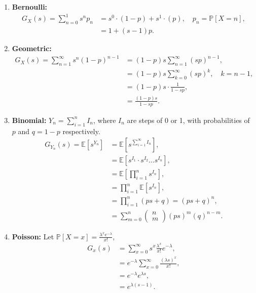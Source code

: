 \documentclass{article}
\begin{document}
\begin{enumerate}
    \item \textbf{Bernoulli:}
    \begin{align}
        G_X(s)=\sum_{n=0}^1 s^np_n &= s^0\cdot (1-p)+s^1\cdot(p),\quad p_n=\mathbb{P}[X=n], \\
        &=1+(s-1)p.
    \end{align}
    
    \item \textbf{Geometric:}
    \begin{align}
        G_X(s) = \sum_{n=1}^\infty s^n(1-p)^{n-1}&=(1-p)s\sum_{n=1}^\infty (sp)^{n-1}, \\
        &=(1-p)s\sum_{k=0}^\infty (sp)^{k},\quad k=n-1, \\
        &=(1-p)s \cdot \frac{1}{1-sp}, \\
        &=\frac{(1-p)s}{1-sp}.
    \end{align}
    
    \item \textbf{Binomial:} $Y_n=\sum_{i=1}^n I_n$, where $I_n$ are steps of 0 or 1, with probabilities of $p$ and $q=1-p$ respectively.
    \begin{align}
        G_{Y_n}(s) = \mathbb{E}[s^{Y_n}]&=\mathbb{E}[s^{\sum_{i=1}^\infty I_n}], \\
        &=\mathbb{E}[s^{I_1}\cdot s^{I_2} \ldots s^{I_n}], \\
        &=\mathbb{E}\left[\prod_{i=1}^n s^{I_n}\right], \\
        &=\prod_{i=1}^n\mathbb{E}[s^{I_n}], \\
        &=\prod_{i=1}^n(ps+q) = (ps+q)^n, \\
        &= \sum_{m=0}^n \begin{pmatrix} n\\m \end{pmatrix}(ps)^m(q)^{n-m}.
    \end{align}
    \item \textbf{Poisson:} Let $\mathbb{P}[X=x]=\frac{\lambda^x e^{-\lambda}}{x!}$,
    \begin{align}
        G_x(s)&=\sum_{x=0}^\infty s^x\frac{\lambda^x}{x!}e^{-\lambda}, \\
        &=e^{-\lambda}\sum_{x=0}^\infty \frac{(\lambda s)^x}{x!}, \\
        &=e^{-\lambda}e^{\lambda s}, \\
        &= e^{\lambda(s-1)}.
    \end{align}
\end{enumerate}
\end{document}
